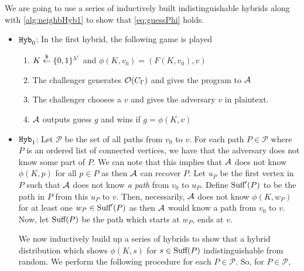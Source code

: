 	We are going to use a series of inductively built indistinguishable hybrids along with \cref{alg:neighbHyb1}
	to show that \cref{eq:guessPhi} holds.
	\begin{itemize}
		\item $\texttt{Hyb}_0$: In the first hybrid, the following game is played
			\begin{enumerate}
				\item $K \overset{\$}{\gets} \{0,1\}^{\lambda'}$ and $\phi(K, v_0) = (F(K, v_0), v)$
				\item The challenger generates $\mathcal{O}(C_\Gamma)$ and gives the program to $\mathcal{A}$
				\item The challenger chooses a $v$ and gives the adversary $v$ in plaintext.
				\item $\mathcal{A}$ outputs guess $g$ and wins if $g = \phi(K, v)$
			\end{enumerate}
		
		\item $\texttt{Hyb}_1$: Let $\mathcal{P}$ be the set of all paths from $v_0$ to $v$. For each path $P \in \mathcal{P}$
		where $P$ is an ordered list of connected vertices, we have that the adversary does not know
		some part of $P$.
		We can note that this implies that $\mathcal{A}$ does not know $\phi(K, p)$ for all $p \in P$ as then
		$\mathcal{A}$ can recover $P$. Let $u_P$ be the first vertex in $P$ such that $\mathcal{A}$ does not know 
		\emph{a path} from $v_0$ to $u_P$. Define $\text{Suff}'(P)$ to be the path in $P$ from this $u_P$ to $v$.
		Then, necessarily, $\mathcal{A}$ does not know $\phi(K, w_P)$ for at least one $w_P \in \text{Suff}'(P)$
		as then $\mathcal{A}$ would know a path from $v_0$ to $v$. Now, let $\text{Suff}(P)$ be the path which starts at $w_P$, ends at $v$.

		We now inductively build up a series of hybrids to show that a hybrid distribution
		which shows $\phi(K, s)$ for $s \in \text{Suff}(P)$ indistinguishable from random.
		We perform the following procedure for each $P \in \mathcal{P}$. So, for $P \in \mathcal{P}$,
		

\end{itemize}
